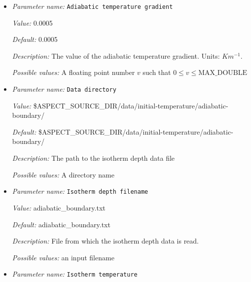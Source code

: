 \begin{itemize}
\item {\it Parameter name:} {\tt Adiabatic temperature gradient}
\label{parameters:Initial temperature model/Adiabatic boundary/Adiabatic temperature gradient}
\label{parameters:Initial_20temperature_20model/Adiabatic_20boundary/Adiabatic_20temperature_20gradient}


{\it Value:} 0.0005


{\it Default:} 0.0005


{\it Description:} The value of the adiabatic temperature gradient. Units: $K m^{-1}$.


{\it Possible values:} A floating point number $v$ such that $0 \leq v \leq \text{MAX\_DOUBLE}$
\item {\it Parameter name:} {\tt Data directory}
\label{parameters:Initial temperature model/Adiabatic boundary/Data directory}
\label{parameters:Initial_20temperature_20model/Adiabatic_20boundary/Data_20directory}


{\it Value:} \$ASPECT\_SOURCE\_DIR/data/initial-temperature/adiabatic-boundary/


{\it Default:} \$ASPECT\_SOURCE\_DIR/data/initial-temperature/adiabatic-boundary/


{\it Description:} The path to the isotherm depth data file


{\it Possible values:} A directory name
\item {\it Parameter name:} {\tt Isotherm depth filename}
\label{parameters:Initial temperature model/Adiabatic boundary/Isotherm depth filename}
\label{parameters:Initial_20temperature_20model/Adiabatic_20boundary/Isotherm_20depth_20filename}


{\it Value:} adiabatic\_boundary.txt


{\it Default:} adiabatic\_boundary.txt


{\it Description:} File from which the isotherm depth data is read.


{\it Possible values:} an input filename
\item {\it Parameter name:} {\tt Isotherm temperature}
\label{parameters:Initial temperature model/Adiabatic boundary/Isotherm temperature}
\label{parameters:Initial_20temperature_20model/Adiabatic_20boundary/Isotherm_20temperature}



\end{itemize}

